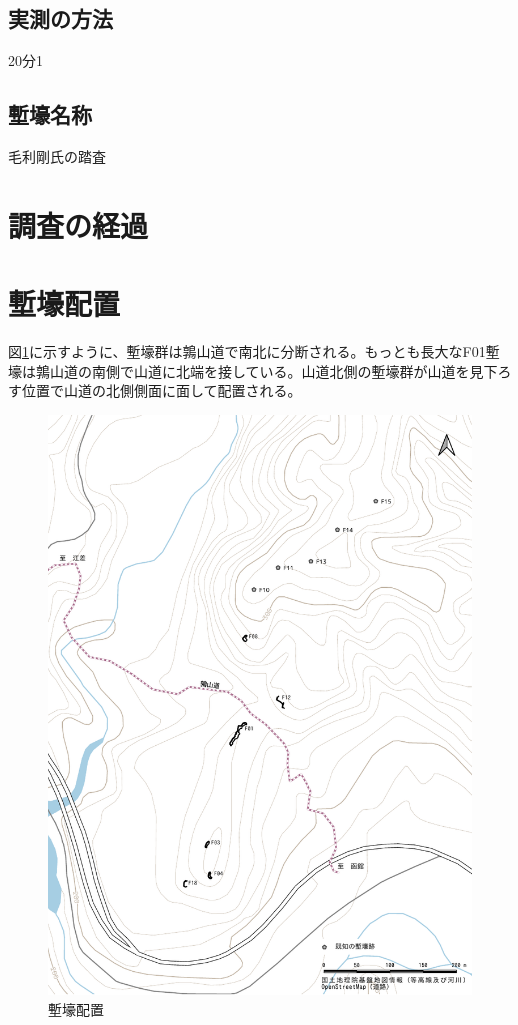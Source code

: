 \documentclass[14Q]{jsarticle}
\begin{document}
\subsection{実測の方法}
20分1

\subsection{塹壕名称}
毛利剛氏の踏査


\section{調査の経過}


\section{塹壕配置}
図\ref{haiti_tate}に示すように、塹壕群は鶉山道で南北に分断される。もっとも長大なF01塹壕は鶉山道の南側で山道に北端を接している。山道北側の塹壕群が山道を見下ろす位置で山道の北側側面に面して配置される。

\begin{figure}[h]
\centering
\includegraphics[width=160truemm]{fig/haitizu_tate.pdf}
\caption{塹壕配置}
\label{haiti_tate}
\end{figure}
\end{document}
